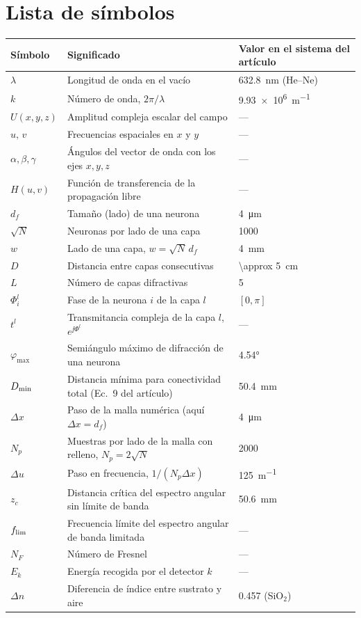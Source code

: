 \chapter*{Lista de símbolos}
\begin{center}
\renewcommand{\arraystretch}{1.25}
\begin{tabularx}{\textwidth}{@{}l X l@{}}
\toprule
Símbolo & Significado & Valor en el sistema del artículo \\
\midrule
$\lambda$ & Longitud de onda en el vacío & \SI{632.8}{nm} (He--Ne)\\
$k$ & Número de onda, $2\pi/\lambda$ & \SI{9.93e6}{m^{-1}}\\
$U(x,y,z)$ & Amplitud compleja escalar del campo & --- \\
$u,\,v$ & Frecuencias espaciales en $x$ y $y$ & --- \\
$\alpha,\beta,\gamma$ & Ángulos del vector de onda con los ejes $x,y,z$ & --- \\
$H(u,v)$ & Función de transferencia de la propagación libre & --- \\
$d_f$ & Tamaño (lado) de una neurona & \SI{4}{\micro m}\\
$\sqrt N$ & Neuronas por lado de una capa & \num{1000}\\
$w$ & Lado de una capa, $w=\sqrt N\,d_f$ & \SI{4}{mm}\\
$D$ & Distancia entre capas consecutivas & \SI{\approx 5}{cm}\\
$L$ & Número de capas difractivas & 5\\
$\Phi^l_i$ & Fase de la neurona $i$ de la capa $l$ & $[0,\pi]$\\
$t^l$ & Transmitancia compleja de la capa $l$, $e^{\jj\Phi^l}$ & --- \\
$\varphi_{\max}$ & Semiángulo máximo de difracción de una neurona & \ang{4.54}\\
$D_{\min}$ & Distancia mínima para conectividad total (Ec.~9 del artículo) & \SI{50.4}{mm}\\
$\Delta x$ & Paso de la malla numérica (aquí $\Delta x=d_f$) & \SI{4}{\micro m}\\
$N_p$ & Muestras por lado de la malla con relleno, $N_p=2\sqrt N$ & \num{2000}\\
$\Delta u$ & Paso en frecuencia, $1/(N_p\Delta x)$ & \SI{125}{m^{-1}}\\
$z_c$ & Distancia crítica del espectro angular sin límite de banda & \SI{50.6}{mm}\\
$f_{\lim}$ & Frecuencia límite del espectro angular de banda limitada & --- \\
$N_F$ & Número de Fresnel & --- \\
$E_k$ & Energía recogida por el detector $k$ & --- \\
$\Delta n$ & Diferencia de índice entre sustrato y aire & 0.457 (SiO$_2$)\\
\bottomrule
\end{tabularx}
\end{center}
